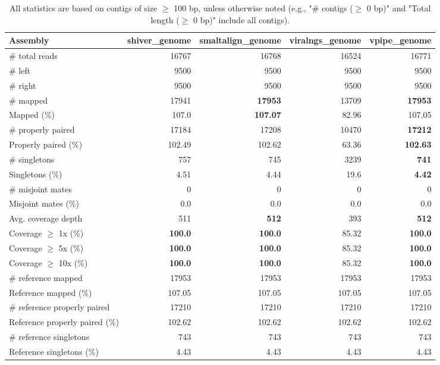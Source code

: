 \documentclass[12pt,a4paper]{article}
\begin{document}
\begin{table}[ht]
\begin{center}
\caption{All statistics are based on contigs of size $\geq$ 100 bp, unless otherwise noted (e.g., "\# contigs ($\geq$ 0 bp)" and "Total length ($\geq$ 0 bp)" include all contigs).}
\begin{tabular}{|l*{4}{|r}|}
\hline
Assembly & shiver\_genome & smaltalign\_genome & viralngs\_genome & vpipe\_genome \\ \hline
\# total reads & 16767 & 16768 & 16524 & 16771 \\ \hline
\# left & 9500 & 9500 & 9500 & 9500 \\ \hline
\# right & 9500 & 9500 & 9500 & 9500 \\ \hline
\# mapped & 17941 & {\bf 17953} & 13709 & {\bf 17953} \\ \hline
Mapped (\%) & 107.0 & {\bf 107.07} & 82.96 & 107.05 \\ \hline
\# properly paired & 17184 & 17208 & 10470 & {\bf 17212} \\ \hline
Properly paired (\%) & 102.49 & 102.62 & 63.36 & {\bf 102.63} \\ \hline
\# singletons & 757 & 745 & 3239 & {\bf 741} \\ \hline
Singletons (\%) & 4.51 & 4.44 & 19.6 & {\bf 4.42} \\ \hline
\# misjoint mates & 0 & 0 & 0 & 0 \\ \hline
Misjoint mates (\%) & 0.0 & 0.0 & 0.0 & 0.0 \\ \hline
Avg. coverage depth & 511 & {\bf 512} & 393 & {\bf 512} \\ \hline
Coverage $\geq$ 1x (\%) & {\bf 100.0} & {\bf 100.0} & 85.32 & {\bf 100.0} \\ \hline
Coverage $\geq$ 5x (\%) & {\bf 100.0} & {\bf 100.0} & 85.32 & {\bf 100.0} \\ \hline
Coverage $\geq$ 10x (\%) & {\bf 100.0} & {\bf 100.0} & 85.32 & {\bf 100.0} \\ \hline
\# reference mapped & 17953 & 17953 & 17953 & 17953 \\ \hline
Reference mapped (\%) & 107.05 & 107.05 & 107.05 & 107.05 \\ \hline
\# reference properly paired & 17210 & 17210 & 17210 & 17210 \\ \hline
Reference properly paired (\%) & 102.62 & 102.62 & 102.62 & 102.62 \\ \hline
\# reference singletons & 743 & 743 & 743 & 743 \\ \hline
Reference singletons (\%) & 4.43 & 4.43 & 4.43 & 4.43 \\ \hline

\end{tabular}
\end{center}
\end{table}
\end{document}
